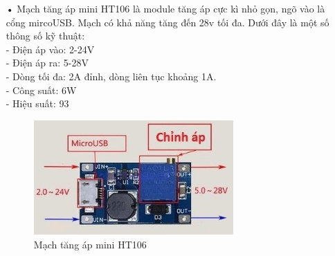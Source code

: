 \begin{itemize}
\item[•]Mạch tăng áp mini HT106 là module tăng áp cực kì nhỏ gọn, ngõ vào là cổng mircoUSB. Mạch có khả năng tăng đến 28v tối đa. Dưới đây là một số thông số kỹ thuật:\\
-	Điện áp vào: 2-24V\\
-	Điện áp ra: 5-28V\\
-	Dòng tối đa: 2A đỉnh, dòng liên tục khoảng 1A.\\
-	Công suất: 6W\\
-	Hiệu suất: 93%
	\begin{figure}[H]
	\centering    
	\includegraphics[width=3in]{ht06}
	\caption[Mạch tăng áp mini HT106]{Mạch tăng áp mini HT106}
	\label{fig:ht06}
	\end{figure}


\end{itemize}
